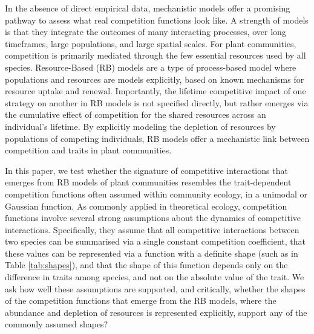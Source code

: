 \documentclass[a4paper,11pt]{article}
\begin{document}
In the absence of direct empirical data, mechanistic models offer a promising pathway to assess what real competition functions look like. A strength of models is that they integrate the outcomes of many interacting processes, over long timeframes, large populations, and large spatial scales. For plant communities, competition is primarily mediated through the few essential resources used by all species. Resource-Based (RB) models are a type of process-based model where populations and resources are models explicitly, based on known mechanisms for resource uptake and renewal. Importantly, the lifetime competitive impact of one strategy on another in RB models is not specified directly, but rather emerges via the cumulative effect of competition for the shared resources across an individual's lifetime. By explicitly modeling the depletion of resources by populations of competing individuals, RB models offer a mechanistic link between competition and traits in plant communities. 

In this paper, we test whether the signature of competitive interactions that emerges from RB models of plant communities resembles the trait-dependent competition functions often assumed within community ecology, in a unimodal or Gaussian function. As commonly applied in theoretical ecology, competition functions involve several strong assumptions about the dynamics of competitive interactions. Specifically, they assume that all competitive interactions between two species can be summarised via a single constant competition coefficient, that these values can be represented via a function with a definite shape (such as in Table \ref{tab:shapes}), and that the shape of this function depends only on the difference in traits among species, and not on the absolute value of the trait. We ask how well these assumptions are supported, and critically, whether the shapes of the competition functions that emerge from the RB models, where the abundance and depletion of resources is represented explicitly, support any of the commonly assumed shapes? 
\end{document}
